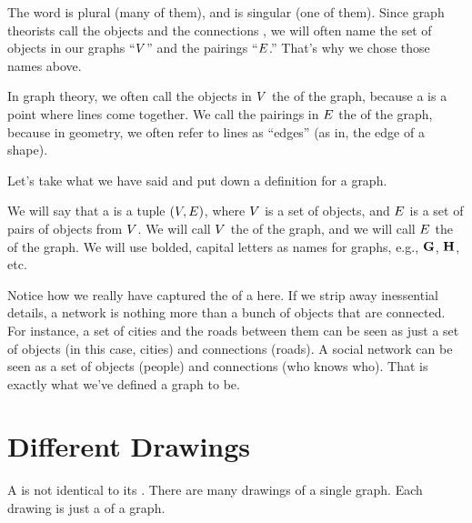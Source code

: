 \documentclass[../../../main.tex]{subfiles}
\begin{document}
\begin{terminology}
  The word  is plural (many of them), and  is singular (one of them). Since graph theorists call the objects  and the connections , we will often name the set of objects in our graphs ``$V$'' and the pairings ``$E$.'' That's why we chose those names above.
\end{terminology}

In graph theory, we often call the objects in $V$ the  of the graph, because a  is a point where lines come together. We call the pairings in $E$ the  of the graph, because in geometry, we often refer to lines as ``edges'' (as in, the edge of a shape).

Let's take what we have said and put down a definition for a graph.

\begin{fdefinition}
  \label{def:graph}
  We will say that a  is a tuple $(V, E)$, where $V$ is a set of objects, and $E$ is a set of pairs of objects from $V$. We will call $V$ the  of the graph, and we will call $E$ the  of the graph. We will use bolded, capital letters as names for graphs, e.g., $\mathbf{G}$, $\mathbf{H}$, etc.
\end{fdefinition}

Notice how we really have captured the  of a  here. If we strip away inessential details, a network is nothing more than a bunch of objects that are connected. For instance, a set of cities and the roads between them can be seen as just a set of objects (in this case, cities) and connections (roads). A social network can be seen as a set of objects (people) and connections (who knows who). That is exactly what we've defined a graph to be.


\section{Different Drawings}

\begin{aside}
  \begin{remark}
    A  is not identical to its . There are many drawings of a single graph. Each drawing is just a  of a graph.
  \end{remark}
\end{aside}
\end{document}

